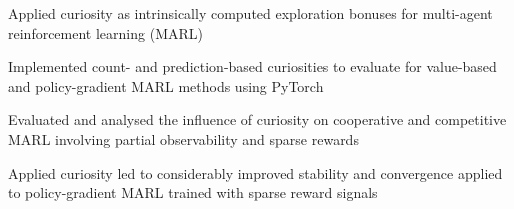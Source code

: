 \documentclass[]{lukas-cv}
\begin{document}
\hfill
\begin{minipage}[t]{0.66\textwidth} 



\vspace{\topsep}
\begin{tightemize}
    \item Applied curiosity as intrinsically computed exploration bonuses for multi-agent reinforcement learning (MARL)
    \item Implemented count- and prediction-based curiosities to evaluate for value-based and policy-gradient MARL methods using PyTorch
    \item Evaluated and analysed the influence of curiosity on cooperative and competitive MARL involving partial observability and sparse rewards
    \item Applied curiosity led to considerably improved stability and convergence applied to policy-gradient MARL trained with sparse reward signals
\end{tightemize}
\sectionsep




\end{minipage}
\end{document}
